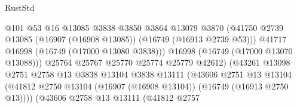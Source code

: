 \begin{lexlean}{RustStd}
\begin{coremodule}
                                              @101
                                              @53
                                              @16
                                              @13085
                                              @3838
                                              @3850
                                              @3864
                                              @13079
                                              @3870
                                              (@41750
                                                @2739
                                                @13085
                                                (@16907 (@16908 @13085))
                                                (@16749 (@16913 @2739 @53)))
                                              @41717
                                              @16998
                                              (@16749 (@17000 @13080 @3838)))
                                            @16998
                                            (@16749 (@17000 @13070 @13088)))
                                          @25764
                                          @25767
                                          @25770
                                          @25774
                                          @25779
                                          @42612)
                                        (@43261
                                          @13098
                                          @2751
                                          @2758
                                          @13
                                          @3838
                                          @13104
                                          @3838
                                          @13111
                                          (@43606
                                            @2751
                                            @13
                                            @13104
                                            (@41812
                                              @2750
                                              @13104
                                              (@16907 (@16908 @13104))
                                              (@16749 (@16913 @2750 @13))))
                                          (@43606
                                            @2758
                                            @13
                                            @13111
                                            (@41812
                                              @2757

\end{coremodule}
\end{lexlean}
